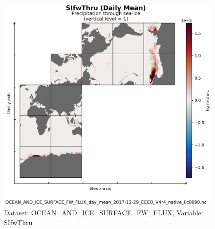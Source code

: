 \begin{figure}[H]
\centering
\includegraphics[scale=0.55]{../images/plots/native_plots/Ocean_and_Sea-Ice_Surface_Freshwater_Fluxes/SIfwThru.png}
\caption{Dataset: OCEAN\_AND\_ICE\_SURFACE\_FW\_FLUX, Variable: SIfwThru}
\label{tab:table-OCEAN_AND_ICE_SURFACE_FW_FLUX_SIfwThru-Plot}
\end{figure}
\newpage
\pagebreak
